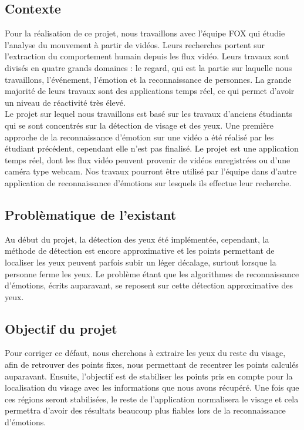 \subsection{Contexte}
Pour la réalisation de ce projet, nous travaillons avec l'équipe FOX qui étudie
l'analyse du mouvement à partir de vidéos. Leurs recherches portent
sur l'extraction du comportement humain depuis les flux vidéo.  Leurs travaux sont
divisés en quatre grands domaines : le regard, qui est la partie sur laquelle nous travaillons, l'événement, l'émotion et la
reconnaissance de personnes. La grande majorité de leurs travaux sont
des applications temps réel, ce qui permet d'avoir un niveau de réactivité très élevé.\\ 

Le projet sur lequel nous travaillons est basé sur les travaux d'anciens étudiants qui se sont concentrés sur la
détection de visage et des yeux. Une première approche de la reconnaissance d'émotion sur une vidéo a été 
réalisé par les étudiant précédent, cependant elle n'est pas finalisé. Le projet est une application temps réel, dont les flux vidéo peuvent 
provenir de vidéos enregistrées ou d'une caméra type webcam. Nos travaux pourront être utilisé par
l'équipe dans d'autre application de reconnaissance d'émotions sur lesquels ils effectue leur recherche.\\

\subsection{Problèmatique de l'existant}
Au début du projet, la détection des yeux été implémentée, cependant,
la méthode de détection est encore approximative et les points permettant de localiser
les yeux peuvent parfois subir un léger décalage, surtout lorsque 
la personne ferme les yeux. Le problème étant que les algorithmes de reconnaissance 
d'émotions, écrits auparavant, se reposent sur cette détection approximative des yeux.\\

\subsection{Objectif du projet}
Pour corriger ce défaut, nous cherchons à extraire les yeux du reste du visage, afin 
de retrouver des points fixes, nous permettant de recentrer les points calculés auparavant.
Ensuite, l'objectif est de stabiliser les points pris en compte pour la localisation du visage avec les informations que
nous avons récupéré.  Une fois que ces
régions seront stabilisées, le reste de l'application normalisera le
visage et cela permettra d'avoir des résultats beaucoup plus fiables lors de la
reconnaissance d'émotions.\\

\newpage
